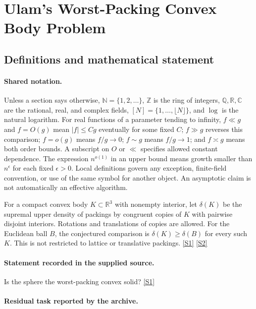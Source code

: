 \documentclass[11pt,a4paper]{article}
\newcommand{\N}{\mathbb{N}}
\newcommand{\Z}{\mathbb{Z}}
\newcommand{\Q}{\mathbb{Q}}
\newcommand{\R}{\mathbb{R}}
\newcommand{\C}{\mathbb{C}}
\newcommand{\sref}[2]{\hyperlink{source:#1:#2}{[S#2]}}
\begin{document}
\section{Ulam's Worst-Packing Convex Body Problem}\label{statement}


\subsection{Definitions and mathematical statement}

\paragraph{Shared notation.}Unless a section says otherwise, $\N=\{1,2,\ldots\}$,
$\Z$ is the ring of integers, $\Q,\R,\C$ are the rational, real, and complex
fields, $[N]=\{1,\ldots,\lfloor N\rfloor\}$, and $\log$ is the natural
logarithm. For real functions of a parameter tending to infinity,
$f\ll g$ and $f=O(g)$ mean $|f|\leq Cg$ eventually for some fixed $C$;
$f\gg g$ reverses this comparison; $f=o(g)$ means $f/g\to0$;
$f\sim g$ means $f/g\to1$; and $f\asymp g$ means both order bounds.
A subscript on $O$ or $\ll$ specifies allowed constant dependence.
The expression $n^{o(1)}$ in an upper bound means growth smaller than
$n^\epsilon$ for each fixed $\epsilon>0$. Local definitions govern any
exception, finite-field convention, or use of the same symbol for another
object. An asymptotic claim is not automatically an effective algorithm.



For a compact convex body $K\subset\R^3$ with nonempty interior, let $\delta(K)$ be the supremal upper density of packings by congruent copies of $K$ with pairwise disjoint interiors. Rotations and translations of copies are allowed. For the Euclidean ball $B$, the conjectured comparison is $\delta(K)\geq\delta(B)$ for every such $K$. This is not restricted to lattice or translative packings. \sref{statement}{1} \sref{statement}{2}

\paragraph{Statement recorded in the supplied source.}
Is the sphere the worst-packing convex solid? \sref{statement}{1}

\paragraph{Residual task reported by the archive.}
\end{document}
